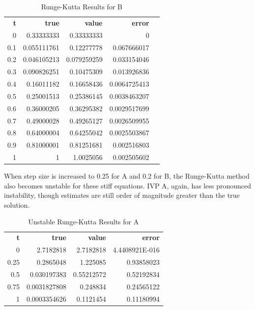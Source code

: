 \documentclass{article}
\begin{document}
\begin{table}[H]
\footnotesize
\centering
\caption{Runge-Kutta Results for B}
\label{tab:b_rk}
\begin{tabular}{rrrrl}
\textbf{t} & \textbf{true} & \textbf{value} & \textbf{error} &  \\
0          & 0.33333333    & 0.33333333     & 0              &  \\
0.1        & 0.055111761   & 0.12277778     & 0.067666017    &  \\
0.2        & 0.046105213   & 0.079259259    & 0.033154046    &  \\
0.3        & 0.090826251   & 0.10475309     & 0.013926836    &  \\
0.4        & 0.16011182    & 0.16658436     & 0.0064725413   &  \\
0.5        & 0.25001513    & 0.25386145     & 0.0038463207   &  \\
0.6        & 0.36000205    & 0.36295382     & 0.0029517699   &  \\
0.7        & 0.49000028    & 0.49265127     & 0.0026509955   &  \\
0.8        & 0.64000004    & 0.64255042     & 0.0025503867   &  \\
0.9        & 0.81000001    & 0.81251681     & 0.002516803    &  \\
1          & 1             & 1.0025056      & 0.002505602    & 
\end{tabular}
\end{table}


When step size is increased to 0.25 for A and 0.2 for B, the Runge-Kutta method also becomes unstable for these stiff equations. IVP A, again, has less pronounced instability, though estimates are still order of magnitude greater than the true solution.


\begin{table}[H]
\footnotesize
\centering
\caption{Unstable Runge-Kutta Results for A}
\label{tab:un_a_rk}
\begin{tabular}{rrrr}
\textbf{t} & \textbf{true} & \textbf{value} & \textbf{error} \\
0          & 2.7182818     & 2.7182818      & 4.4408921E-016 \\
0.25       & 0.2865048     & 1.225085       & 0.93858023     \\
0.5        & 0.030197383   & 0.55212572     & 0.52192834     \\
0.75       & 0.0031827808  & 0.248834       & 0.24565122     \\
1          & 0.0003354626  & 0.1121454      & 0.11180994        
\end{tabular}
\end{table}
\end{document}
